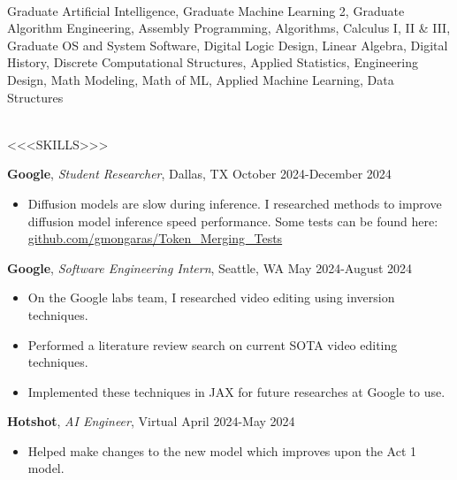 \documentclass[a4paper,10pt]{article}
\begin{document}
\vspace{5pt}
 \\
Graduate Artificial Intelligence, Graduate Machine Learning 2, Graduate Algorithm Engineering, Assembly Programming, Algorithms, Calculus I, II \& III, Graduate OS and System Software, Digital Logic Design, Linear Algebra, Digital History, Discrete Computational Structures, Applied Statistics, Engineering Design, Math Modeling, Math of ML, Applied Machine Learning, Data Structures


\vspace{5pt}
 \vspace{1pt} \\
<<<SKILLS>>>






\vspace{5pt}
 \vspace{1pt}

\noindent\textbf{Google}, \textit{Student Researcher}, Dallas, TX \hfill October 2024-December 2024
\begin{itemize}[noitemsep,topsep=0pt]
  \item Diffusion models are slow during inference. I researched methods to improve diffusion model inference speed performance. Some tests can be found here: \href{https://github.com/gmongaras/Token_Merging_Tests}{github.com/gmongaras/Token\_Merging\_Tests}
\end{itemize}

\noindent\textbf{Google}, \textit{Software Engineering Intern}, Seattle, WA \hfill May 2024-August 2024
\begin{itemize}[noitemsep,topsep=0pt]
  \item On the Google labs team, I researched video editing using inversion techniques.
  \item Performed a literature review search on current SOTA video editing techniques.
  \item Implemented these techniques in JAX for future researches at Google to use.
\end{itemize}

\noindent\textbf{Hotshot}, \textit{AI Engineer}, Virtual \hfill April 2024-May 2024
\begin{itemize}[noitemsep,topsep=0pt]
  \item Helped make changes to the new model which improves upon the Act 1 model.
\end{itemize}
\end{document}
